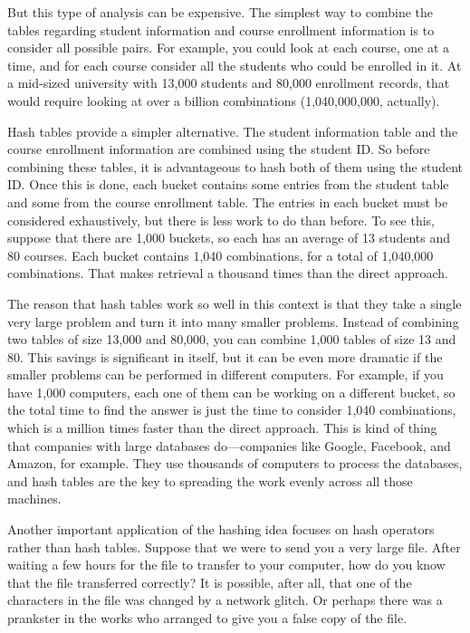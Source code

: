 But this type of analysis can be expensive. The simplest
way to combine the tables regarding student information and course
enrollment information is to consider all possible pairs. For example,
you could look at each course, one at a time, and for each course consider
all the students who could be enrolled in it. At a mid-sized university
with 13,000 students and 80,000 enrollment records, that would require
looking at over a billion combinations (1,040,000,000, actually).

Hash tables provide a simpler alternative. The student information table
and the course enrollment information are combined using the student ID.
So before combining these tables, it is advantageous to hash both of them
using the student ID. Once this is done, each bucket contains some entries
from the student table and some from the course enrollment table. The entries
in each bucket must be considered exhaustively, but there is less work to do
than before.
To see this, suppose that there are 1,000 buckets, so
each has an average of 13 students and 80 courses. Each bucket
contains 1,040 combinations, for a total of 1,040,000 combinations.
That makes retrieval a thousand times than the direct approach.

The reason that hash tables work so well in this context is that they take
a single very large problem and turn it into many smaller problems. Instead
of combining two tables of size 13,000 and 80,000, you can combine 1,000
tables of size 13 and 80. This savings is significant in itself, but it can
be even more dramatic if the smaller problems can be performed in different
computers. For example, if you have 1,000 computers, each one of them can be
working on a different bucket, so the total time to find the answer is
just the time to consider 1,040 combinations, which is a million times
faster than the direct approach.
This is kind of thing that companies with large databases do---companies like Google, Facebook, and Amazon,
for example. They use thousands of computers to process the databases, and
hash tables are the key to spreading the work evenly across all those
machines.

Another important application of the hashing idea focuses on hash operators
rather than hash tables.
Suppose that we were to send you a very large file. After waiting a few hours
for the file to transfer to your computer, how do you know that the file
transferred correctly? It is possible, after all, that one of the characters
in the file was changed by a network glitch. Or perhaps there was a prankster
in the works who arranged to give you a false copy of the file.


